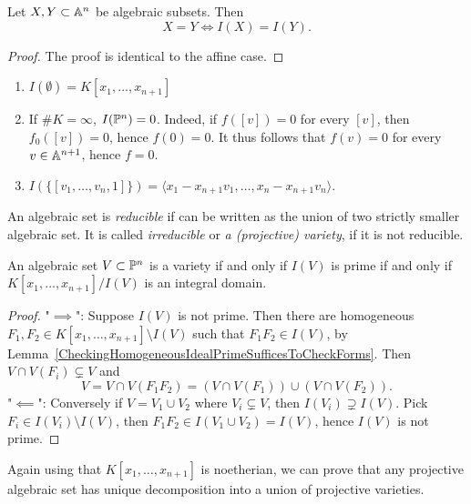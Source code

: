     \begin{lemma}\label{ProjectiveI(.)IsInjective}
        Let $X,Y\subset \mathbb{A}^n$ be algebraic subsets. Then 
        $$X=Y \iff I(X) = I(Y).$$ 
    \end{lemma}
    \begin{proof}
        The proof is identical to the affine case.
    \end{proof}
    \begin{example}
        \begin{enumerate}
            \item $I(\emptyset)=K[x_1,\dots,x_{n+1}]$
            \item If $\#K=\infty$, $I(\mathbb{P}^n)=0$. Indeed, if $f([v])=0$ for every $[v]$, then $f_0([v])=0$, hence $f(0)=0$. It thus follows that $f(v)=0$ for every $v\in \mathbb{A}^{n+1}$, hence $f=0$.
            \item $I(\{[v_1,\dots,v_n,1]\})=\langle x_1-x_{n+1}v_1,\dots,x_n-x_{n+1}v_n\rangle$.
        \end{enumerate}
    \end{example}
    \begin{definition}
        An algebraic set is \textit{reducible} if can be written as the union of two strictly smaller algebraic set. It is called \textit{irreducible} or \textit{a (projective) variety}, if it is not reducible.
    \end{definition}
    \begin{lemma}
        An algebraic set $V\subset \mathbb{P}^n$ is a variety if and only if $I(V)$ is prime if and only if $K[x_1,\dots,x_{n+1}]/I(V)$ is an integral domain.
    \end{lemma}
    \begin{proof}
        "$\implies$": Suppose $I(V)$ is not prime. Then there are homogeneous $F_1,F_2\in K[x_1,\dots,x_{n+1}]\setminus I(V)$ such that $F_1F_2\in I(V)$, by Lemma~\ref{CheckingHomogeneousIdealPrimeSufficesToCheckForms}. Then $V\cap V(F_i)\subsetneq V$ and 
        $$V= V\cap V(F_1F_2)=(V\cap V(F_1))\cup(V\cap V(F_2)).$$
        "$\impliedby$": Conversely if $V=V_1\cup V_2$ where $V_i\subsetneq V$, then $I(V_i)\supsetneq I(V)$. Pick $F_i\in I(V_i)\setminus I(V)$, then $F_1F_2\in I(V_1\cup V_2)=I(V)$, hence $I(V)$ is not prime.  
    \end{proof}
    Again using that $K[x_1,\dots,x_{n+1}]$ is noetherian, we can prove that any projective algebraic set has unique decomposition into a union of projective varieties.
